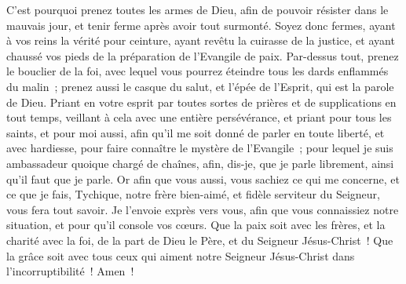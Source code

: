 \begin{multicols}{2}
C'est pourquoi prenez toutes les armes de Dieu, afin de pouvoir résister dans le mauvais jour, et tenir ferme après avoir tout surmonté.
Soyez donc fermes, ayant à vos reins la vérité pour ceinture, ayant revêtu la cuirasse de la justice,
et ayant chaussé vos pieds de la préparation de l'Evangile de paix.
Par-dessus tout, prenez le bouclier de la foi, avec lequel vous pourrez éteindre tous les dards enflammés du malin~;
prenez aussi le casque du salut, et l'épée de l'Esprit, qui est la parole de Dieu.
Priant en votre esprit par toutes sortes de prières et de supplications en tout temps, veillant à cela avec une entière persévérance, et priant pour tous les saints,
et pour moi aussi, afin qu'il me soit donné de parler en toute liberté, et avec hardiesse, pour faire connaître le mystère de l'Evangile~;
pour lequel je suis ambassadeur quoique chargé de chaînes, afin, dis-je, que je parle librement, ainsi qu'il faut que je parle.
Or afin que vous aussi, vous sachiez ce qui me concerne, et ce que je fais, Tychique, notre frère bien-aimé, et fidèle serviteur du Seigneur, vous fera tout savoir.
Je l'envoie exprès vers vous, afin que vous connaissiez notre situation, et pour qu'il console vos cœurs.
Que la paix soit avec les frères, et la charité avec la foi, de la part de Dieu le Père, et du Seigneur Jésus-Christ~!
Que la grâce soit avec tous ceux qui aiment notre Seigneur Jésus-Christ dans l'incorruptibilité~! Amen~!
\PPE{}
\end{multicols}
